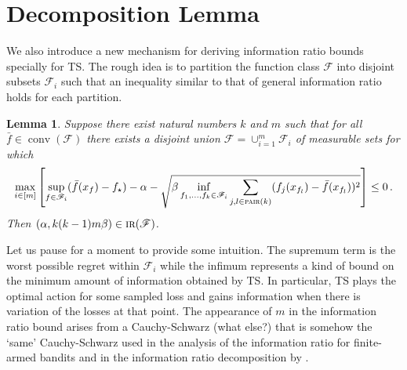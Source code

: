 \documentclass[letter, 12pt]{report}
\newcommand{\pair}{\operatorname{\textsc{pair}}}
\newcommand{\sF}{\mathscr F}
\newcommand{\conv}{\operatorname{conv}}
\newcommand{\1}{\mathbf{1}}
\newcommand{\IR}{\operatorname{\textsc{ir}}}
\newcommand{\ts}{\textsc{TS}\xspace}
\theoremstyle{plain}
\newtheorem{lemma}[theorem]{Lemma}
\theoremstyle{definition}
\theoremstyle{remark}
\begin{document}
\section{Decomposition Lemma}
We also introduce a new mechanism for deriving information ratio bounds specially for \ts.
The rough idea is to partition the function class $\sF$ into disjoint subsets $\sF_i$ such that an inequality similar to that of general information ratio holds for each partition.
\begin{lemma}\label{lem:decomp-big}
    Suppose there exist natural numbers $k$ and $m$ such that for all $\bar f \in \conv(\sF)$ there exists a disjoint union $\sF = \cup_{i=1}^m \sF_i$ of measurable sets
    for which
    \begin{align*}
        \max_{i \in [m]} \left[\sup_{f \in \sF_i} (\bar f(x_f) - f_\star) - \alpha - \sqrt{\beta \inf_{f_1,\ldots,f_k \in \sF_i} \sum_{j,l \in \pair(k)} (f_j(x_{f_l}) - \bar f(x_{f_l}))^2} \right] \leq 0 \,.
    \end{align*}
    Then $(\alpha, k(k-1)m\beta) \in \IR(\sF)$.
\end{lemma}
Let us pause for a moment to provide some intuition.
The supremum term is the worst possible regret within $\sF_i$ while the infimum represents a kind of bound on the minimum amount of information obtained by \ts{}.
In particular, \ts{} plays the optimal action for some sampled loss and gains information when there is variation of the losses at that point.
The appearance of $m$ in the information ratio bound arises from a Cauchy-Schwarz (what else?) that is somehow the `same' Cauchy-Schwarz used in the analysis
of the information ratio for finite-armed bandits \citep{RV14} and in the information ratio decomposition by \cite{Lat20-cvx}.
\end{document}
